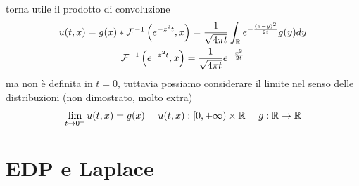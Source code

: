 torna utile il prodotto di convoluzione
\begin{gather*}
u(t, x) = g(x) *\mathcal{F}^{- 1}\left(e^{- z^{2} t}, x\right) = \frac{1}{\sqrt{4\pi t}}\int_{\mathbb{R}} e^{- \frac{(x - y)^{2}}{2t}} g(y) dy\\
\mathcal{F}^{- 1}\left(e^{- z^{2} t}, x\right) = \frac{1}{\sqrt{4\pi t}} e^{- \frac{x^{2}}{2t}}
\end{gather*}
ma non è definita in $t = 0$, tuttavia possiamo considerare il limite nel senso delle distribuzioni (non dimostrato, molto extra)
\begin{equation*}
\lim_{t\rightarrow 0^{+}} u(t, x) = g(x) \ \ \ \ u(t, x) : [0, + \infty) \times \RR \ \ \ \ g: \RR\rightarrow \RR
\end{equation*}

\section{EDP e Laplace}

